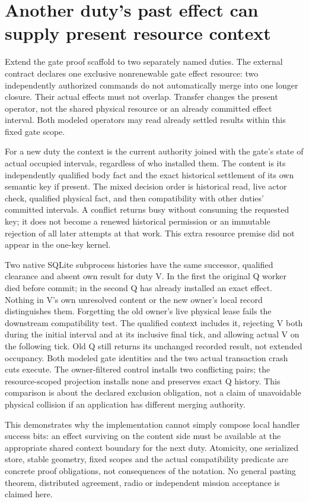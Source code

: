 \documentclass{article}
\begin{document}
\section*{Another duty's past effect can supply present resource context}
Extend the gate proof scaffold to two separately named duties.
The external contract declares one exclusive nonrenewable gate
effect resource: two independently authorized commands do not
automatically merge into one longer closure. Their actual effects
must not overlap. Transfer changes the present operator, not the
shared physical resource or an already committed effect interval.
Both modeled operators may read already settled results within
this fixed gate scope.

For a new duty the context is the current authority joined with
the gate's state of actual occupied intervals, regardless of who
installed them. The content is its independently qualified body
fact and the exact historical settlement of its own semantic
key if present. The mixed decision order is historical read,
live actor check, qualified physical fact, and then compatibility
with other duties' committed intervals. A conflict returns busy
without consuming the requested key; it does not become a renewed
historical permission or an immutable rejection of all later
attempts at that work. This extra resource premise did not appear
in the one-key kernel.

Two native SQLite subprocess histories have the same successor,
qualified clearance and absent own result for duty V. In the first
the original Q worker died before commit; in the second Q has
already installed an exact effect. Nothing in V's own unresolved
content or the new owner's local record distinguishes them.
Forgetting the old owner's live physical lease fails the downstream
compatibility test. The qualified context includes it, rejecting V
both during the initial interval and at its inclusive final tick,
and allowing actual V on the following tick. Old Q still returns
its unchanged recorded result, not extended occupancy. Both modeled
gate identities and the two actual transaction crash cuts execute.
The owner-filtered control installs two conflicting pairs; the
resource-scoped projection installs none and preserves exact Q
history. This comparison is about the declared exclusion
obligation, not a claim of unavoidable physical collision if an
application has different merging authority.

This demonstrates why the implementation cannot simply compose
local handler success bits: an effect surviving on the content
side must be available at the appropriate shared context boundary
for the next duty. Atomicity, one serialized store, stable geometry,
fixed scopes and the actual compatibility predicate are concrete
proof obligations, not consequences of the notation. No general
pasting theorem, distributed agreement, radio or independent
mission acceptance is claimed here.
\end{document}
